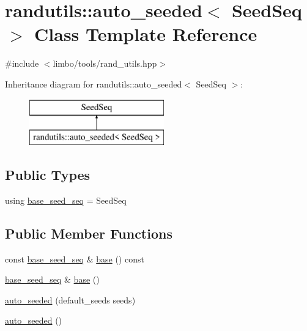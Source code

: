 \hypertarget{classrandutils_1_1auto__seeded}{}\section{randutils\+:\+:auto\+\_\+seeded$<$ Seed\+Seq $>$ Class Template Reference}
\label{classrandutils_1_1auto__seeded}


{\ttfamily \#include $<$limbo/tools/rand\+\_\+utils.\+hpp$>$}

Inheritance diagram for randutils\+:\+:auto\+\_\+seeded$<$ Seed\+Seq $>$\+:\begin{figure}[H]
\begin{center}
\leavevmode
\includegraphics[height=2.000000cm]{classrandutils_1_1auto__seeded}
\end{center}
\end{figure}
\subsection*{Public Types}
\begin{DoxyCompactItemize}
\item 
using \hyperlink{classrandutils_1_1auto__seeded_a91549adccbb3c55e5d18b69c6647856f}{base\+\_\+seed\+\_\+seq} = Seed\+Seq
\end{DoxyCompactItemize}
\subsection*{Public Member Functions}
\begin{DoxyCompactItemize}
\item 
const \hyperlink{classrandutils_1_1auto__seeded_a91549adccbb3c55e5d18b69c6647856f}{base\+\_\+seed\+\_\+seq} \& \hyperlink{classrandutils_1_1auto__seeded_a632a62881c4ee2492a58920beb338074}{base} () const 
\item 
\hyperlink{classrandutils_1_1auto__seeded_a91549adccbb3c55e5d18b69c6647856f}{base\+\_\+seed\+\_\+seq} \& \hyperlink{classrandutils_1_1auto__seeded_af77746278c7d80a81f57912d0c4431f0}{base} ()
\item 
\hyperlink{classrandutils_1_1auto__seeded_a2d3b3febda1981eb6637f6b1ce535c87}{auto\+\_\+seeded} (default\+\_\+seeds seeds)
\item 
\hyperlink{classrandutils_1_1auto__seeded_a57acbed4b30b44634419a24fb866cbaf}{auto\+\_\+seeded} ()
\end{DoxyCompactItemize}


